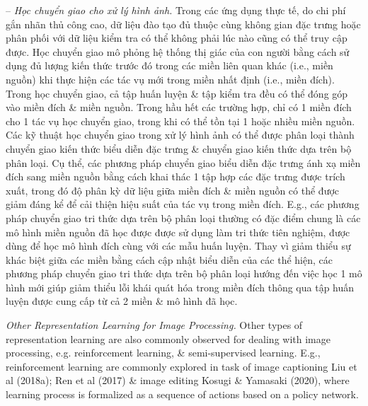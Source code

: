 \documentclass{article}
\begin{document}
\begin{itemize}
\begin{itemize}
\begin{itemize}
            -- {\it Học chuyển giao cho xử lý hình ảnh.} Trong các ứng dụng thực tế, do chi phí gắn nhãn thủ công cao, dữ liệu đào tạo đủ thuộc cùng không gian đặc trưng hoặc phân phối với dữ liệu kiểm tra có thể không phải lúc nào cũng có thể truy cập được. Học chuyển giao mô phỏng hệ thống thị giác của con người bằng cách sử dụng đủ lượng kiến thức trước đó trong các miền liên quan khác (i.e., miền nguồn) khi thực hiện các tác vụ mới trong miền nhất định (i.e., miền đích). Trong học chuyển giao, cả tập huấn luyện \& tập kiểm tra đều có thể đóng góp vào miền đích \& miền nguồn. Trong hầu hết các trường hợp, chỉ có 1 miền đích cho 1 tác vụ học chuyển giao, trong khi có thể tồn tại 1 hoặc nhiều miền nguồn. Các kỹ thuật học chuyển giao trong xử lý hình ảnh có thể được phân loại thành chuyển giao kiến thức biểu diễn đặc trưng \& chuyển giao kiến thức dựa trên bộ phân loại. Cụ thể, các phương pháp chuyển giao biểu diễn đặc trưng ánh xạ miền đích sang miền nguồn bằng cách khai thác 1 tập hợp các đặc trưng được trích xuất, trong đó độ phân kỳ dữ liệu giữa miền đích \& miền nguồn có thể được giảm đáng kể để cải thiện hiệu suất của tác vụ trong miền đích. E.g., các phương pháp chuyển giao tri thức dựa trên bộ phân loại thường có đặc điểm chung là các mô hình miền nguồn đã học được được sử dụng làm tri thức tiên nghiệm, được dùng để học mô hình đích cùng với các mẫu huấn luyện. Thay vì giảm thiểu sự khác biệt giữa các miền bằng cách cập nhật biểu diễn của các thể hiện, các phương pháp chuyển giao tri thức dựa trên bộ phân loại hướng đến việc học 1 mô hình mới giúp giảm thiểu lỗi khái quát hóa trong miền đích thông qua tập huấn luyện được cung cấp từ cả 2 miền \& mô hình đã học.

            {\it Other Representation Learning for Image Processing.} Other types of representation learning are also commonly observed for dealing with image processing, e.g. reinforcement learning, \& semi-supervised learning. E.g., reinforcement learning are commonly explored in task of image captioning Liu et al (2018a); Ren et al (2017) \& image editing Kosugi \& Yamasaki (2020), where learning process is formalized as a sequence of actions based on a policy network.


\end{itemize}
\end{itemize}
\end{itemize}
\end{document}
